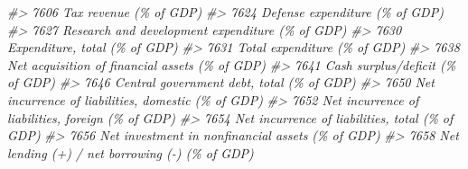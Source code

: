 \documentclass[
]{bxjsbook}
\newenvironment{Shaded}{\begin{snugshade}}{\end{snugshade}}
\newcommand{\CommentTok}[1]{\textcolor[rgb]{0.56,0.35,0.01}{\textit{#1}}}
\theoremstyle{definition}
\theoremstyle{definition}
\theoremstyle{definition}
\theoremstyle{definition}
\theoremstyle{remark}
\begin{document}
\begin{Shaded}
\begin{Highlighting}[]
\CommentTok{\#\textgreater{} 7606                                                                                                                                                     Tax revenue (\% of GDP)}
\CommentTok{\#\textgreater{} 7624                                                                                                                                             Defense expenditure (\% of GDP)}
\CommentTok{\#\textgreater{} 7627                                                                                                                            Research and development expenditure (\% of GDP)}
\CommentTok{\#\textgreater{} 7630                                                                                                                                              Expenditure, total (\% of GDP)}
\CommentTok{\#\textgreater{} 7631                                                                                                                                               Total expenditure (\% of GDP)}
\CommentTok{\#\textgreater{} 7638                                                                                                                             Net acquisition of financial assets (\% of GDP)}
\CommentTok{\#\textgreater{} 7641                                                                                                                                            Cash surplus/deficit (\% of GDP)}
\CommentTok{\#\textgreater{} 7646                                                                                                                                  Central government debt, total (\% of GDP)}
\CommentTok{\#\textgreater{} 7650                                                                                                                         Net incurrence of liabilities, domestic (\% of GDP)}
\CommentTok{\#\textgreater{} 7652                                                                                                                          Net incurrence of liabilities, foreign (\% of GDP)}
\CommentTok{\#\textgreater{} 7654                                                                                                                            Net incurrence of liabilities, total (\% of GDP)}
\CommentTok{\#\textgreater{} 7656                                                                                                                           Net investment in nonfinancial assets (\% of GDP)}
\CommentTok{\#\textgreater{} 7658                                                                                                                             Net lending (+) / net borrowing ({-}) (\% of GDP)}

\end{Highlighting}
\end{Shaded}
\end{document}
